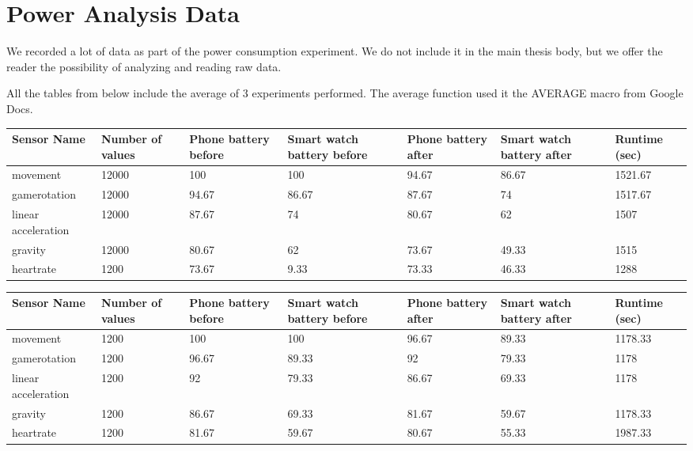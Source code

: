 
\chapter{Power Analysis Data} %

\label{AppendixPower} %


We recorded a lot of data as part of the power consumption experiment. We do not include it in the main thesis body, but we offer the reader
the possibility of analyzing and reading raw data.

All the tables from below include the average of 3 experiments performed. The average function used it the AVERAGE macro from Google Docs.

\begin{center}

  \begin{tabular}{ |p{2.5cm}|p{1.5cm}|p{1.5cm}|p{1.5cm}|p{1.5cm}|p{1.5cm}|p{1.5cm}|}
  \hline
Sensor Name &Number of values &	Phone battery before &	Smart watch battery before &	Phone battery after	& Smart watch battery after &	Runtime (sec) \\
  \hline
movement 	& 	12000	& 100	& 100	&  94.67	 &  86.67 	& 1521.67 \\
gamerotation	 & 	12000	&	94.67	&	86.67	& 	87.67	&	 74	& 1517.67 \\
linear acceleration 	& 12000	&	87.67	&	74 	&	80.67	& 62	& 	1507 \\ 
gravity 	&	12000	&	80.67	&	62	     	&		73.67	& 	49.33	& 	1515 \\
heartrate & 	1200	&	73.67	&	9.33		&	73.33	& 	46.33	& 	1288 \\
  \hline
  \end{tabular}
   \label{tab:title1} 
\end{center}

\begin{center}
  \begin{tabular}{ |p{2.5cm}|p{1.5cm}|p{1.5cm}|p{1.5cm}|p{1.5cm}|p{1.5cm}|p{1.5cm}|}
  \hline
Sensor Name &Number of values &	Phone battery before &	Smart watch battery before &	Phone battery after	& Smart watch battery after &	Runtime (sec) \\
  \hline
movement 	& 	1200	& 100	& 100	& 96.67	& 89.33	&1178.33 \\
gamerotation	 & 1200	&96.67	& 89.33	& 92	& 79.33	& 1178  \\
linear acceleration 	& 1200	& 92	& 79.33	& 86.67	& 69.33	& 1178  \\ 
gravity 	&	1200	& 86.67	& 69.33	& 81.67	& 59.67	& 1178.33	 \\
heartrate & 	1200	& 81.67	& 59.67	& 80.67	& 55.33	& 1987.33 \\
  \hline
  \end{tabular}
     \label{tab:title2} 
\end{center}


